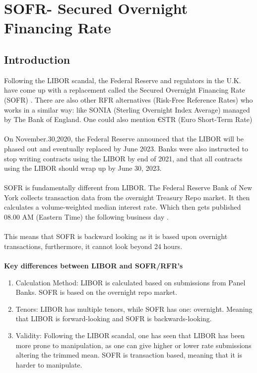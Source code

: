 \chapter{SOFR- Secured Overnight Financing Rate}

\section{Introduction}
Following the LIBOR scandal, the Federal Reserve and regulators in the U.K. have come up with a replacement called the Secured Overnight Financing Rate (SOFR) .
There are also other RFR alternatives (Risk-Free Reference Rates)  who works in a similar way: like SONIA (Sterling Overnight Index Average) 
 managed by The Bank of England. One could also mention €STR (Euro Short-Term Rate) 
\cite{CME_SOFR}
\\~\\
On November.30,2020, the Federal Reserve announced that the LIBOR will be phased out and eventually replaced by June 2023. Banks were also instructed to stop writing contracts using the LIBOR by end of 2021, and that all contracts using the LIBOR should wrap up by June 30, 2023. \cite{hayes_2022}
\\~\\ 
SOFR is fundamentally different from LIBOR. The Federal Reserve Bank of New York collects transaction data from the overnight Treasury Repo market. It then calculates a volume-weighted median interest rate. Which then gets published 08.00 AM (Eastern Time) the following business day \cite{ARRC_SOFR}.
\\~\\ 
This means that SOFR is backward looking as it is based upon overnight transactions, furthermore, it cannot look beyond 24 hours.  
\\~\\
\textbf{Key differences between LIBOR and SOFR/RFR's}

\begin{enumerate}
    \item Calculation Method: LIBOR is calculated based on submissions from Panel Banks. SOFR is based on the overnight repo market. 
    \item Tenors: LIBOR has multiple tenors, while SOFR has one: overnight. Meaning that LIBOR is forward-looking and SOFR is backwards-looking. 
    \item Validity: Following the LIBOR scandal, one has seen that LIBOR has been more prone to manipulation, as one can give higher or lower rate submissions altering the trimmed mean. SOFR is transaction based, meaning that it is harder to manipulate. 
\end{enumerate}

